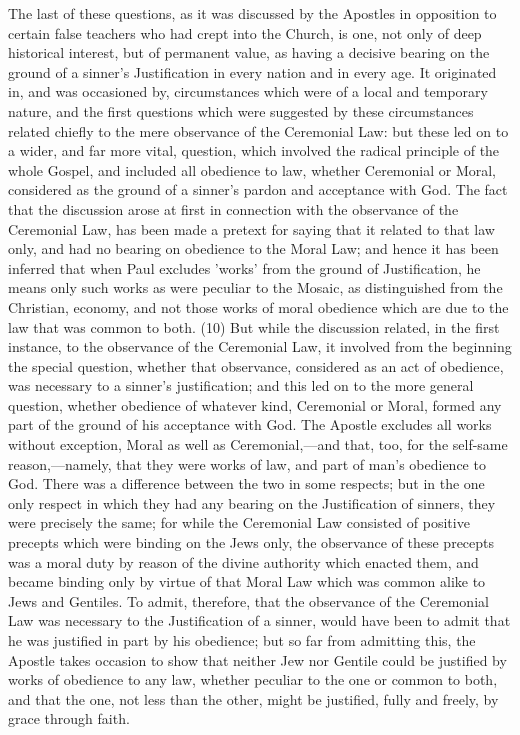\documentclass[
]{book}
\begin{document}
The last of these questions, as it was discussed by the Apostles in opposition to certain false teachers who had crept into the Church, is one, not only of deep historical interest, but of permanent value, as having a decisive bearing on the ground of a sinner's Justification in every nation and in every age. It originated in, and was occasioned by, circumstances which were of a local and temporary nature, and the first questions which were suggested by these circumstances related chiefly to the mere observance of the Ceremonial Law: but these led on to a wider, and far more vital, question, which involved the radical principle of the whole Gospel, and included all obedience to law, whether Ceremonial or Moral, considered as the ground of a sinner's pardon and acceptance with God. The fact that the discussion arose at first in connection with the observance of the Ceremonial Law, has been made a pretext for saying that it related to that law only, and had no bearing on obedience to the Moral Law; and hence it has been inferred that when Paul excludes 'works' from the ground of Justification, he means only such works as were peculiar to the Mosaic, as distinguished from the Christian, economy, and not those works of moral obedience which are due to the law that was common to both. (10) But while the discussion related, in the first instance, to the observance of the Ceremonial Law, it involved from the beginning the special question, whether that observance, considered as an act of obedience, was necessary to a sinner's justification; and this led on to the more general question, whether obedience of whatever kind, Ceremonial or Moral, formed any part of the ground of his acceptance with God. The Apostle excludes all works without exception, Moral as well as Ceremonial,---and that, too, for the self-same reason,---namely, that they were works of law, and part of man's obedience to God. There was a difference between the two in some respects; but in the one only respect in which they had any bearing on the Justification of sinners, they were precisely the same; for while the Ceremonial Law consisted of positive precepts which were binding on the Jews only, the observance of these precepts was a moral duty by reason of the divine authority which enacted them, and became binding only by virtue of that Moral Law which was common alike to Jews and Gentiles. To admit, therefore, that the observance of the Ceremonial Law was necessary to the Justification of a sinner, would have been to admit that he was justified in part by his obedience; but so far from admitting this, the Apostle takes occasion to show that neither Jew nor Gentile could be justified by works of obedience to any law, whether peculiar to the one or common to both, and that the one, not less than the other, might be justified, fully and freely, by grace through faith.
\end{document}
